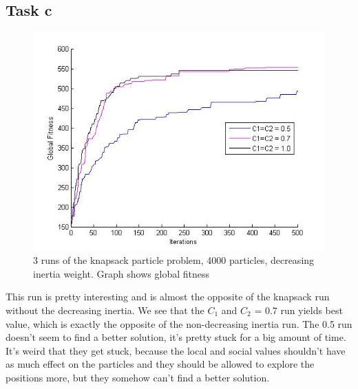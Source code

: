 \documentclass[12pt, a4paper]{article}
\begin{document}
\subsection{Task c}
\begin{figure}[H]
\begin{center}
\includegraphics[width=\linewidth]{KnapSack_withInertia}
\caption{3 runs of the knapsack particle problem, 4000 particles, decreasing inertia weight. Graph shows global fitness}
\end{center}
\end{figure}
This run is pretty interesting and is almost the opposite of the knapsack run without the decreasing inertia. We see that the  $C_1$ and $C_2$ = 0.7 run yields best value, which is exactly the opposite of the non-decreasing inertia run. The 0.5 run doesn't seem to find a better solution, it's pretty stuck for a big amount of time. It's weird that they get stuck, because the local and social values shouldn't have as much effect on the particles and they should be allowed to explore the positions more, but they somehow can't find a better solution.
\end{document}
